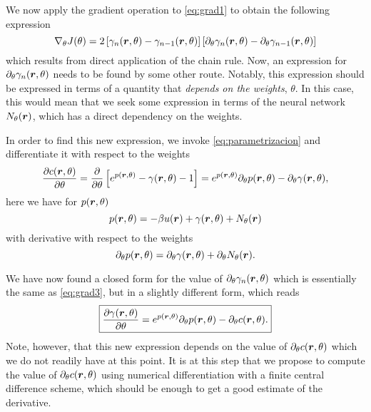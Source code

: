 We now apply the gradient operation to \autoref{eq:grad1} to obtain the following
expression
\begin{equation}
    \nabla_{\theta} J(\theta) = 2 \left[\gamma_{n}(\bm{r}, \theta) - \gamma_{n-1}(\bm{r}, \theta) \right]
    \left[ \partial_{\theta} \gamma_{n}(\bm{r}, \theta) - \partial_{\theta} \gamma_{n-1}(\bm{r}, \theta) \right]
    \label{eq:grad2}
\end{equation}
which results from direct application of the chain rule. Now, an expression for
$\partial_{\theta} \gamma_{n}(\bm{r}, \theta)$ needs to
be found by some other route. Notably, this expression should be expressed in terms
of a quantity that \emph{depends on the weights}, $\theta$. In this case, 
this would mean that we seek some expression in terms of the neural
network $N_{\theta}(\bm{r})$, which has a direct dependency on the weights.

In order to find this new expression, we invoke \autoref{eq:parametrizacion} and
differentiate it with respect to the weights
\begin{equation}
    \frac{\partial c(\bm{r}, \theta)}{\partial \theta} = \frac{\partial}{\partial \theta}
    \left[ e^{p(\bm{r}, \theta)} - \gamma(\bm{r}, \theta) - 1 \right] =
    e^{p(\bm{r}, \theta)} \partial_{\theta} p(\bm{r}, \theta) - \partial_{\theta} \gamma(\bm{r}, \theta)
    ,
    \label{eq:grad3}
\end{equation}
here we have for $p(\bm{r}, \theta)$
\begin{equation}
    p(\bm{r}, \theta) = -\beta u(\bm{r}) + \gamma(\bm{r}, \theta) + N_{\theta}(\bm{r})
    \label{eq:pr}    
\end{equation}
with derivative with respect to the weights
\begin{equation}
    \partial_{\theta} p(\bm{r}, \theta) = \partial_{\theta} \gamma(\bm{r}, \theta) + \partial_{\theta} N_{\theta}(\bm{r})
    .
    \label{eq:grad-pr}
\end{equation}

We have now found a closed form for the value of
$\partial_{\theta} \gamma_{n}(\bm{r}, \theta)$
which is essentially the same as \autoref{eq:grad3}, but in a slightly different form,
which reads
\begin{equation}
    \boxed{
    \frac{\partial \gamma(\bm{r}, \theta)}{\partial \theta} =
    e^{p(\bm{r}, \theta)} \partial_{\theta} p(\bm{r}, \theta) - \partial_{\theta} c(\bm{r}, \theta)
    .
    }
    \label{eq:grad4}
\end{equation}
Note, however, that this new expression depends on the value of
$\partial_{\theta} c(\bm{r}, \theta)$
which we do not readily have at this point. It is at this step that we propose
to compute the value of $\partial_{\theta} c(\bm{r}, \theta)$ using numerical
differentiation with a finite central difference scheme, which should be enough to get a good estimate of the derivative.

